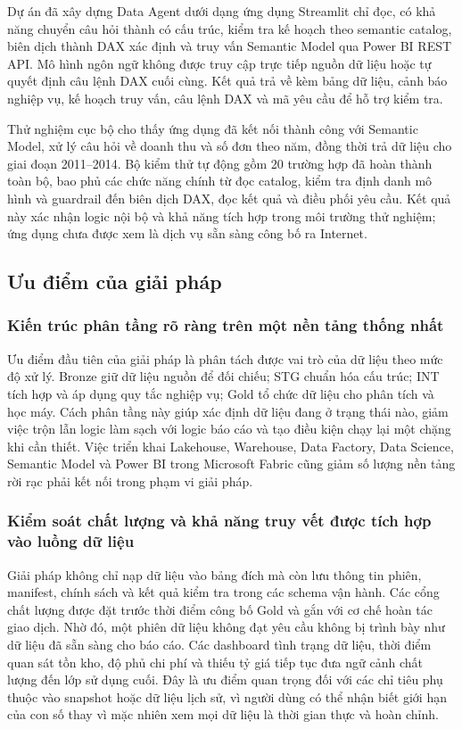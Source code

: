 Dự án đã xây dựng Data Agent dưới dạng ứng dụng Streamlit chỉ đọc, có khả năng chuyển câu hỏi thành  có cấu trúc, kiểm tra kế hoạch theo semantic catalog, biên dịch thành DAX xác định và truy vấn Semantic Model qua Power BI REST API. Mô hình ngôn ngữ không được truy cập trực tiếp nguồn dữ liệu hoặc tự quyết định câu lệnh DAX cuối cùng. Kết quả trả về kèm bảng dữ liệu, cảnh báo nghiệp vụ, kế hoạch truy vấn, câu lệnh DAX và mã yêu cầu để hỗ trợ kiểm tra.

Thử nghiệm cục bộ cho thấy ứng dụng đã kết nối thành công với Semantic Model, xử lý câu hỏi về doanh thu và số đơn theo năm, đồng thời trả dữ liệu cho giai đoạn 2011--2014. Bộ kiểm thử tự động gồm 20 trường hợp đã hoàn thành toàn bộ, bao phủ các chức năng chính từ đọc catalog, kiểm tra định danh mô hình và guardrail đến biên dịch DAX, đọc kết quả và điều phối yêu cầu. Kết quả này xác nhận logic nội bộ và khả năng tích hợp trong môi trường thử nghiệm; ứng dụng chưa được xem là dịch vụ sẵn sàng công bố ra Internet.

\subsection{Ưu điểm của giải pháp}

\subsubsection{Kiến trúc phân tầng rõ ràng trên một nền tảng thống nhất}

Ưu điểm đầu tiên của giải pháp là phân tách được vai trò của dữ liệu theo mức độ xử lý. Bronze giữ dữ liệu nguồn để đối chiếu; STG chuẩn hóa cấu trúc; INT tích hợp và áp dụng quy tắc nghiệp vụ; Gold tổ chức dữ liệu cho phân tích và học máy. Cách phân tầng này giúp xác định dữ liệu đang ở trạng thái nào, giảm việc trộn lẫn logic làm sạch với logic báo cáo và tạo điều kiện chạy lại một chặng khi cần thiết. Việc triển khai Lakehouse, Warehouse, Data Factory, Data Science, Semantic Model và Power BI trong Microsoft Fabric cũng giảm số lượng nền tảng rời rạc phải kết nối trong phạm vi giải pháp.

\subsubsection{Kiểm soát chất lượng và khả năng truy vết được tích hợp vào luồng dữ liệu}

Giải pháp không chỉ nạp dữ liệu vào bảng đích mà còn lưu thông tin phiên, manifest, chính sách và kết quả kiểm tra trong các schema vận hành. Các cổng chất lượng được đặt trước thời điểm công bố Gold và gắn với cơ chế hoàn tác giao dịch. Nhờ đó, một phiên dữ liệu không đạt yêu cầu không bị trình bày như dữ liệu đã sẵn sàng cho báo cáo. Các dashboard tình trạng dữ liệu, thời điểm quan sát tồn kho, độ phủ chi phí và thiếu tỷ giá tiếp tục đưa ngữ cảnh chất lượng đến lớp sử dụng cuối. Đây là ưu điểm quan trọng đối với các chỉ tiêu phụ thuộc vào snapshot hoặc dữ liệu lịch sử, vì người dùng có thể nhận biết giới hạn của con số thay vì mặc nhiên xem mọi dữ liệu là thời gian thực và hoàn chỉnh.

